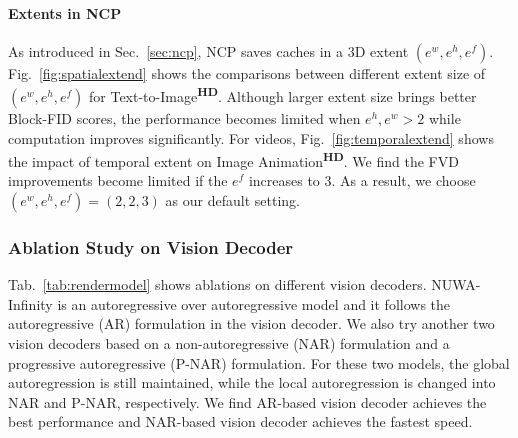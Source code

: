 \documentclass{article}
\begin{document}


\paragraph{Extents in NCP}
As introduced in Sec.~\ref{sec:ncp}, NCP saves caches in a 3D extent $(e^w, e^h, e^f)$. Fig.~\ref{fig:spatialextend} shows the comparisons between different extent size of $(e^w, e^h, e^f)$ for Text-to-Image\textsuperscript{\textbf{HD}}. Although larger extent size brings better Block-FID scores, the performance becomes limited when $e^{h},e^{w}>2$ while computation improves significantly. For videos, Fig.~\ref{fig:temporalextend} shows the impact of temporal extent on Image Animation\textsuperscript{\textbf{HD}}. We find the FVD improvements become limited if the $e^f$ increases to 3. As a result, we choose $(e^w, e^h, e^f)=(2,2,3)$ as our default setting. 




\subsubsection{Ablation Study on Vision Decoder}\label{sec:ablvd}
Tab.~\ref{tab:rendermodel} shows ablations on different vision decoders. NUWA-Infinity is an autoregressive over autoregressive model and it follows the autoregressive (AR) formulation in the vision decoder. We also try another two vision decoders based on a non-autoregressive (NAR) formulation and a progressive autoregressive (P-NAR) formulation. For these two models, the global autoregression is still maintained, while the local autoregression is changed into NAR and P-NAR, respectively. We find AR-based vision decoder achieves the best performance and NAR-based vision decoder achieves the fastest speed.
\end{document}
